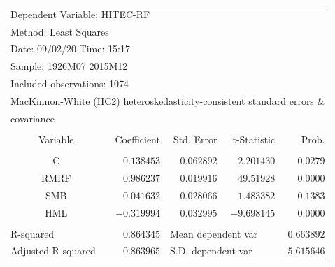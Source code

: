 \documentclass[12pt]{article}
\numberwithin{equation}{section} %
\begin{document}
\begin{table}[H]
\centering
\begin{tabular}{lrrrr}
\multicolumn{3}{l}{Dependent Variable: HITEC-RF}&\multicolumn{1}{c}{}&\multicolumn{1}{c}{}\\
\multicolumn{2}{l}{Method: Least Squares}&\multicolumn{1}{c}{}&\multicolumn{1}{c}{}&\multicolumn{1}{c}{}\\
\multicolumn{2}{l}{Date: 09/02/20   Time: 15:17}&\multicolumn{1}{c}{}&\multicolumn{1}{c}{}&\multicolumn{1}{c}{}\\
\multicolumn{2}{l}{Sample: 1926M07 2015M12}&\multicolumn{1}{c}{}&\multicolumn{1}{c}{}&\multicolumn{1}{c}{}\\
\multicolumn{3}{l}{Included observations: 1074}&\multicolumn{1}{c}{}&\multicolumn{1}{c}{}\\
\multicolumn{5}{l}{MacKinnon-White (HC2) heteroskedasticity-consistent standard errors \&}\\
\multicolumn{2}{l}{covariance}&\multicolumn{1}{c}{}&\multicolumn{1}{c}{}&\multicolumn{1}{c}{}\\
[4.5pt] \hline \\ [-4.5pt]
\multicolumn{1}{c}{Variable}&\multicolumn{1}{r}{Coefficient}&\multicolumn{1}{r}{Std. Error}&\multicolumn{1}{r}{t-Statistic}&\multicolumn{1}{r}{Prob.}\\
[4.5pt] \hline \\ [-4.5pt]
\multicolumn{1}{c}{C}&\multicolumn{1}{r}{$0.138453$}&\multicolumn{1}{r}{$0.062892$}&\multicolumn{1}{r}{$2.201430$}&\multicolumn{1}{r}{$0.0279$}\\
\multicolumn{1}{c}{RMRF}&\multicolumn{1}{r}{$0.986237$}&\multicolumn{1}{r}{$0.019916$}&\multicolumn{1}{r}{$49.51928$}&\multicolumn{1}{r}{$0.0000$}\\
\multicolumn{1}{c}{SMB}&\multicolumn{1}{r}{$0.041632$}&\multicolumn{1}{r}{$0.028066$}&\multicolumn{1}{r}{$1.483382$}&\multicolumn{1}{r}{$0.1383$}\\
\multicolumn{1}{c}{HML}&\multicolumn{1}{r}{$-0.319994$}&\multicolumn{1}{r}{$0.032995$}&\multicolumn{1}{r}{$-9.698145$}&\multicolumn{1}{r}{$0.0000$}\\
[4.5pt] \hline \\ [-4.5pt]
\multicolumn{1}{l}{R-squared}&\multicolumn{1}{r}{$0.864345$}&\multicolumn{2}{l}{Mean dependent var}&\multicolumn{1}{r}{$0.663892$}\\
\multicolumn{1}{l}{Adjusted R-squared}&\multicolumn{1}{r}{$0.863965$}&\multicolumn{2}{l}{S.D. dependent var}&\multicolumn{1}{r}{$5.615646$}\\

\end{tabular}
\end{table}
\end{document}
